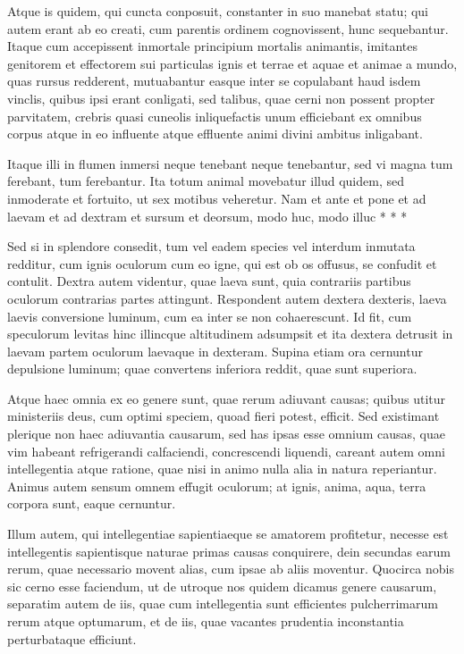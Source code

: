  Atque is quidem, qui cuncta conposuit, constanter in suo manebat statu; qui autem erant ab eo creati, cum parentis ordinem cognovissent, hunc sequebantur. Itaque cum accepissent inmortale principium mortalis animantis, imitantes genitorem et effectorem sui particulas ignis et terrae et aquae et animae a mundo, quas rursus redderent, mutuabantur easque inter se copulabant haud isdem vinclis, quibus ipsi erant conligati, sed talibus, quae cerni non possent propter parvitatem, crebris quasi cuneolis inliquefactis unum efficiebant ex omnibus corpus atque in eo influente atque effluente animi divini ambitus inligabant.

 Itaque illi in flumen inmersi neque tenebant neque tenebantur, sed vi magna tum ferebant, tum ferebantur. Ita totum animal movebatur illud quidem, sed inmoderate et fortuito, ut sex motibus veheretur. Nam et ante et pone et ad laevam et ad dextram et sursum et deorsum, modo huc, modo illuc * * *

 Sed si in splendore consedit, tum vel eadem species vel interdum inmutata redditur, cum ignis oculorum cum eo igne, qui est ob os offusus, se confudit et contulit. Dextra autem videntur, quae laeva sunt, quia contrariis partibus oculorum contrarias partes attingunt. Respondent autem dextera dexteris, laeva laevis conversione luminum, cum ea inter se non cohaerescunt. Id fit, cum speculorum levitas hinc illincque altitudinem adsumpsit et ita dextera detrusit in laevam partem oculorum laevaque in dexteram. Supina etiam ora cernuntur depulsione luminum; quae convertens inferiora reddit, quae sunt superiora.

 Atque haec omnia ex eo genere sunt, quae rerum adiuvant causas; quibus utitur ministeriis deus, cum optimi speciem, quoad fieri potest, efficit. Sed existimant plerique non haec adiuvantia causarum, sed has ipsas esse omnium causas, quae vim habeant refrigerandi calfaciendi, concrescendi liquendi, careant autem omni intellegentia atque ratione, quae nisi in animo nulla alia in natura reperiantur. Animus autem sensum omnem effugit oculorum; at ignis, anima, aqua, terra corpora sunt, eaque cernuntur.

 Illum autem, qui intellegentiae sapientiaeque se amatorem profitetur, necesse est intellegentis sapientisque naturae primas causas conquirere, dein secundas earum rerum, quae necessario movent alias, cum ipsae ab aliis moventur. Quocirca nobis sic cerno esse faciendum, ut de utroque nos quidem dicamus genere causarum, separatim autem de iis, quae cum intellegentia sunt efficientes pulcherrimarum rerum atque optumarum, et de iis, quae vacantes prudentia inconstantia perturbataque efficiunt.

